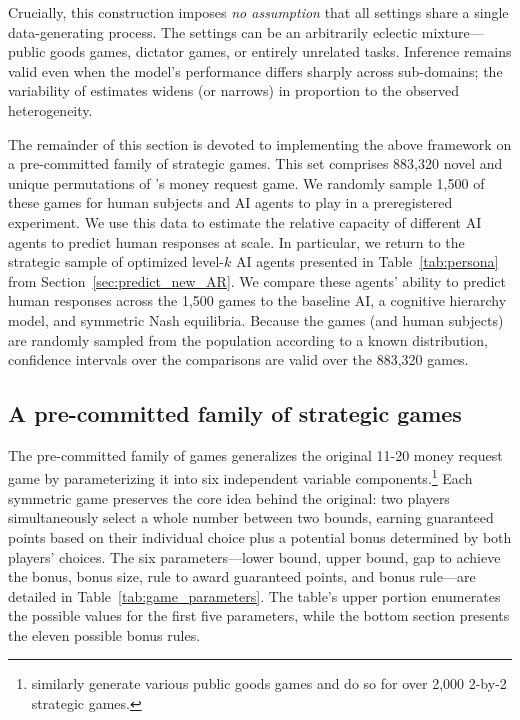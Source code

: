 \documentclass[11pt]{article}
\theoremstyle{definition}
\newcommand{\aisub}{AI agent}
\newcommand{\NGamesS}{1,500}
\newcommand{\TotalGames}{883,320}
\begin{document}
Crucially, this construction imposes \emph{no assumption} that all settings share a single data-generating process.
The settings can be an arbitrarily eclectic mixture---public goods games, dictator games, or entirely unrelated tasks.   
Inference remains valid even when the model's performance differs sharply across sub-domains; the variability of estimates widens (or narrows) in proportion to the observed heterogeneity.

The remainder of this section is devoted to implementing the above framework on a pre-committed family of strategic games.
This set comprises \TotalGames{} novel and unique permutations of \citeauthor{1120Arad2012}'s money request game.
We randomly sample \NGamesS{} of these games for human subjects and \aisub{s} to play in a preregistered experiment.
We use this data to estimate the relative capacity of different \aisub{s} to predict human responses at scale.
In particular, we return to the strategic sample of optimized level-$k$ \aisub{s} presented in Table~\ref{tab:persona} from Section~\ref{sec:predict_new_AR}.
We compare these agents' ability to predict human responses across the \NGamesS{} games to the baseline AI, a cognitive hierarchy model, and symmetric Nash equilibria.
Because the games (and human subjects) are randomly sampled from the population according to a known distribution, confidence intervals over the comparisons are valid over the \TotalGames{} games.

\subsection{A pre-committed family of strategic games}

The pre-committed family of games generalizes the original 11-20 money request game by parameterizing it into six independent variable components.\footnote{\cite{alsobay2025integrative} similarly generate various public goods games and \cite{zhu2025capturing} do so for over 2,000 2-by-2 strategic games.}
Each symmetric game preserves the core idea behind the original: two players simultaneously select a whole number between two bounds, earning guaranteed points based on their individual choice plus a potential bonus determined by both players' choices.
The six parameters---lower bound, upper bound, gap to achieve the bonus, bonus size, rule to award guaranteed points, and bonus rule---are detailed in Table~\ref{tab:game_parameters}.
The table's upper portion enumerates the possible values for the first five parameters, while the bottom section presents the eleven possible bonus rules. 
\end{document}
